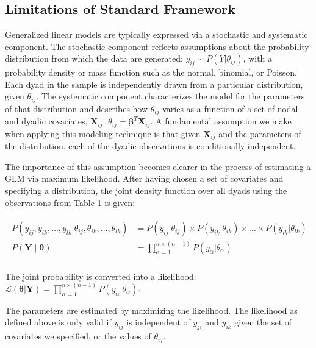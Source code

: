 \documentclass[12pt,pdflatex]{elsarticle}
\begin{document}
\subsection{Limitations of Standard Framework}

Generalized linear models are typically expressed via a stochastic and systematic component. The stochastic component reflects assumptions about the probability distribution from which the data are generated: $y_{ij} \sim P(Y | \theta_{ij})$, with a probability density or mass function such as the normal, binomial, or Poisson. Each dyad in the sample is independently drawn from a particular distribution, given $\theta_{ij}$. The systematic component characterizes the model for the parameters of that distribution and describes how $\theta_{ij}$ varies as a function of a set of nodal and dyadic covariates, $\mathbf{X}_{ij}$: $\theta_{ij} = \bm\beta^{T} \mathbf{X}_{ij}$. A fundamental assumption we make when applying this modeling technique is that given $\mathbf{X}_{ij}$ and the parameters of the distribution, each of the dyadic observations is conditionally independent.

The importance of this assumption becomes clearer in the process of estimating a GLM via maximum likelihood. After having chosen a set of covariates and specifying a distribution, the joint density function over all dyads using the observations from Table 1 is given:

\vspace{-8mm}
\begin{align}
\begin{aligned}
	P(y_{ij}, y_{ik}, \ldots, y_{lk} | \theta_{ij}, \theta_{ik}, \ldots, \theta_{lk}) &= P(y_{ij} | \theta_{ij}) \times P(y_{ik} | \theta_{ik}) \times \ldots \times P(y_{lk} | \theta_{lk}) \\
	P(\mathbf{Y} \; | \; \bm{\theta}) &= \prod_{\alpha=1}^{n \times (n-1)} P(y_{\alpha} | \theta_{\alpha})  \\
\end{aligned}
\end{align}

\noindent The joint probability is converted into a likelihood: $\displaystyle \mathcal{L} (\bm{\theta} | \mathbf{Y}) = \prod_{\alpha=1}^{n \times (n-1)} P(y_{\alpha} | \theta_{\alpha})$.

The parameters are estimated by maximizing the likelihood. The likelihood as defined above is only valid if  $y_{ij}$ is independent of $y_{ji}$ and $y_{ik}$ given the set of covariates we specified, or the values of $\theta_{ij}$. 
\end{document}

